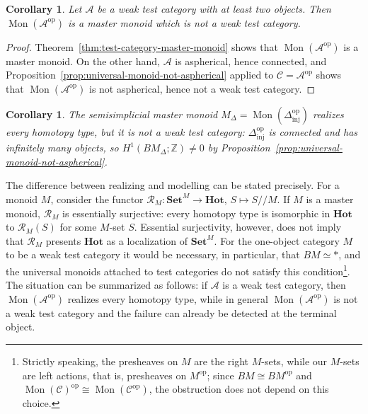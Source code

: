\documentclass[11pt]{amsart}
\newtheorem{corollary}[teo]{Corollary}
\theoremstyle{definition}
\theoremstyle{remark}
\numberwithin{figure}{section}%
\newcommand{\CC}{\mathcal{C}}
\DeclareMathOperator{\Mon}{Mon}
\newcommand{\Set}{\mathbf{Set}}
\newcommand{\Hot}{\mathbf{Hot}}
\newcommand{\Dinj}{\Delta_{\mathrm{inj}}}
\newcommand{\op}{\mathrm{op}}
\newcommand{\A}{\mathcal{A}}
\begin{document}
\begin{corollary}
\label{cor:master-not-test}
Let $\A$ be a weak test category with at least two objects. Then $\Mon(\A^{\op})$ is a master monoid which is not a weak test category.
\end{corollary}

\begin{proof}
Theorem~\ref{thm:test-category-master-monoid} shows that $\Mon(\A^{\op})$ is a master monoid. On the other hand, $\A$ is aspherical, hence connected, and Proposition~\ref{prop:universal-monoid-not-aspherical} applied to $\CC=\A^{\op}$ shows that $\Mon(\A^{\op})$ is not aspherical, hence not a weak test category.
\end{proof}

\begin{corollary}
\label{cor:semisimplicial-master-not-test}
The semisimplicial master monoid $M_\Delta=\Mon(\Dinj^{\op})$ realizes every homotopy type, but it is not a weak test category: $\Dinj^{\op}$ is connected and has infinitely many objects, so $H^1(BM_\Delta;\mathbb Z)\neq0$ by Proposition~\ref{prop:universal-monoid-not-aspherical}.
\end{corollary}

The difference between realizing and modelling can be stated precisely. For a monoid $M$, consider the functor $\mathcal R_M\colon\Set^M\to\Hot$, $S\mapsto S/\!/M$. If $M$ is a master monoid, $\mathcal R_M$ is essentially surjective: every homotopy type is isomorphic in $\Hot$ to $\mathcal R_M(S)$ for some $M$-set $S$. Essential surjectivity, however, does not imply that $\mathcal R_M$ presents $\Hot$ as a localization of $\Set^M$. For the one-object category $M$ to be a weak test category it would be necessary, in particular, that $BM\simeq*$, and the universal monoids attached to test categories do not satisfy this condition\footnote{Strictly speaking, the presheaves on $M$ are the right $M$-sets, while our $M$-sets are left actions, that is, presheaves on $M^{\op}$; since $BM\cong BM^{\op}$ and $\Mon(\CC)^{\op}\cong\Mon(\CC^{\op})$, the obstruction does not depend on this choice.}. The situation can be summarized as follows: if $\A$ is a weak test category, then $\Mon(\A^{\op})$ realizes every homotopy type, while in general $\Mon(\A^{\op})$ is not a weak test category and the failure can already be detected at the terminal object.
\end{document}
